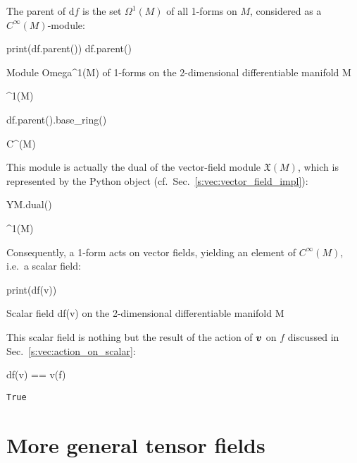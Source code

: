 The parent of $\mathrm{d}f$ is the set $\Omega^1(M)$ of all 1-forms on $M$,
considered as a $C^\infty(M)$-module:
\begin{NBin}
print(df.parent())
df.parent()
\end{NBin}
\begin{NBprint}
Module Omega^1(M) of 1-forms on the 2-dimensional differentiable manifold M
\end{NBprint}
\begin{NBoutM}
\Omega^{1}\left(M\right)
\end{NBoutM}
\begin{NBin}
df.parent().base_ring()
\end{NBin}
\begin{NBoutM}
C^{\infty}\left(M\right)
\end{NBoutM}
This module is actually the dual of the vector-field module $\mathfrak{X}(M)$,
which is represented
by the Python object  (cf.\ Sec.~\ref{s:vec:vector_field_impl}):
\begin{NBin}
YM.dual()
\end{NBin}
\begin{NBoutM}
\Omega^{1}\left(M\right)
\end{NBoutM}
Consequently, a 1-form acts on vector fields, yielding an element of
$C^\infty(M)$, i.e.\ a scalar field:
\begin{NBin}
print(df(v))
\end{NBin}
\begin{NBprint}
Scalar field df(v) on the 2-dimensional differentiable manifold M
\end{NBprint}
This scalar field is nothing but the result of the action of $\bm{v}$ on $f$
discussed in Sec.~\ref{s:vec:action_on_scalar}:
\begin{NBin}
df(v) == v(f)
\end{NBin}
\begin{NBout}
\texttt{True}
\end{NBout}

\section{More general tensor fields}

